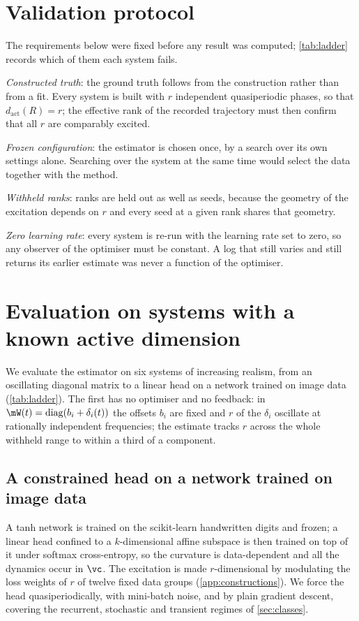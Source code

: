 \documentclass[twoside]{article}
\begin{document}
\section{Validation protocol}\label{sec:protocol}

The requirements below were fixed before any result was computed; \cref{tab:ladder} records which
of them each system fails.

\emph{Constructed truth}: the ground truth follows from the construction rather than from a fit.
Every system is built with $r$ independent quasiperiodic phases, so that $d_{\mathrm{act}}(R) = r$;
the effective rank of the recorded trajectory must then confirm that all $r$ are comparably
excited.

\emph{Frozen configuration}: the estimator is chosen once, by a search over its own settings alone.
Searching over the system at the same time would select the data together with the
method.

\emph{Withheld ranks}: ranks are held out as well as seeds, because the geometry of the excitation
depends on $r$ and every seed at a given rank shares that geometry.

\emph{Zero learning rate}: every system is re-run with the learning rate set to zero, so any
observer of the optimiser must be constant. A log that still varies
and still returns its earlier estimate was never a function of the optimiser.

\section{Evaluation on systems with a known active dimension}\label{sec:ladder}

We evaluate the estimator on six systems of increasing realism, from an oscillating diagonal matrix
to a linear head on a network trained on image data (\cref{tab:ladder}).\label{sec:matrix} The
first has no optimiser and no feedback: in $\mW(t) = \operatorname{diag}(b_i + \delta_i(t))$ the
offsets $b_i$ are fixed and $r$ of the $\delta_i$ oscillate at rationally independent frequencies;
the estimate tracks $r$ across the whole withheld range to within a third of a component.

\subsection{A constrained head on a network trained on image data}\label{sec:digits}

A tanh network is trained on the scikit-learn handwritten digits and frozen; a linear head
confined to a $k$-dimensional affine subspace is then trained on top of it under softmax
cross-entropy, so the curvature is data-dependent and all the dynamics occur in $\vc$. The
excitation is made $r$-dimensional by modulating the loss weights of $r$ of twelve fixed data
groups (\cref{app:constructions}). We force
the head quasiperiodically, with mini-batch noise, and by plain gradient descent, covering the
recurrent, stochastic and transient regimes of \cref{sec:classes}.
\end{document}
